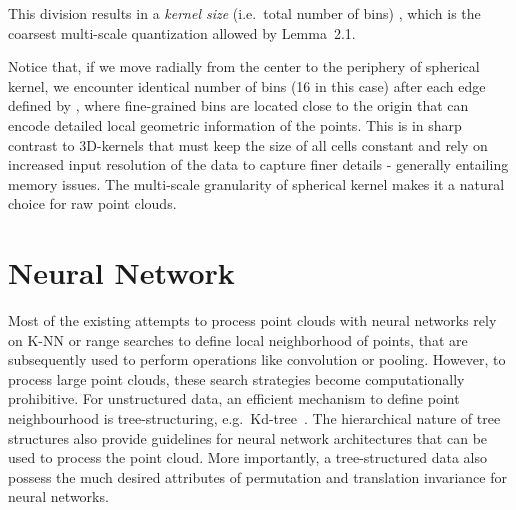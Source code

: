 \documentclass[10pt,twocolumn,letterpaper]{article}
\begin{document}
  This division results in a \emph{kernel size} (i.e.~total number of bins) , which is the coarsest multi-scale quantization allowed by Lemma~2.1. 

Notice that, if we move radially from the center to the periphery of  spherical kernel, we encounter identical number of bins (16 in this case) after each edge defined by  , where fine-grained bins are located close to the origin that can encode detailed local geometric information of the points. This is in sharp contrast to 3D-kernels that  must keep the size of all cells constant and rely on increased input resolution of the data to capture  finer details - generally entailing memory issues.
The multi-scale granularity of spherical kernel makes it a natural choice for raw point clouds. \vspace{-1mm}
\section{Neural Network}
\vspace{-2mm}
Most of the existing attempts to  process point clouds with neural networks  \cite{li2018so,li2018pointcnn,qi2017pointnetplusplus,shen2018mining,simonovsky2017dynamic}  rely on K-NN  or range searches to define local neighborhood of points, that are  subsequently used  to perform  operations like convolution or pooling. However, to process large point clouds, these search strategies become computationally prohibitive.   For unstructured data, an efficient mechanism to define point neighbourhood  is tree-structuring, e.g.~Kd-tree~\cite{bentley1975multidimensional}.  The hierarchical nature of tree structures also provide guidelines for  neural network architectures that can be used to process the point cloud. More importantly, a tree-structured data also possess
the much desired attributes of permutation and translation invariance for  neural networks.
\end{document}
